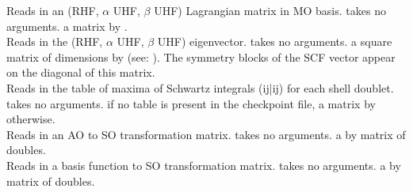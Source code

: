 {Reads in an (RHF, $\alpha$ UHF, $\beta$ UHF) Lagrangian matrix in MO basis.}
{takes no arguments.}
{a matrix  by .} \\
{Reads in the (RHF, $\alpha$ UHF, $\beta$ UHF) eigenvector.}
{takes no arguments.}
{a square matrix of dimensions 
by  (see: ).
The symmetry blocks of the SCF vector appear
on the diagonal of this matrix.} \\
{Reads in the table of maxima of Schwartz integrals (ij|ij)
for each shell doublet.}
{takes no arguments.}
{ if no table is present in the checkpoint file,
a matrix  by  otherwise.} \\
{Reads in an AO to SO transformation matrix.}
{takes no arguments.}
{a  by  matrix of doubles.} \\
{Reads in a basis function to SO transformation matrix.}
{takes no arguments.}
{a  by  matrix of doubles.}
